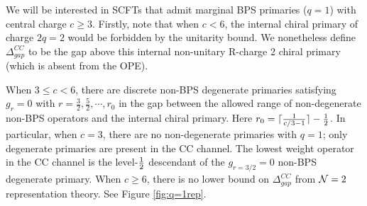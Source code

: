 \documentclass[12pt]{article}
\begin{document}
We will be interested in SCFTs that admit marginal BPS primaries ($q=1$) with central charge $c\geq 3$.
Firstly, note that when $c<6$, the internal chiral primary of charge $2q=2$ would be forbidden by the unitarity bound. We nonetheless define $\Delta^{CC}_{gap}$ to be the gap above this internal non-unitary R-charge 2 chiral primary (which is absent from the OPE).


When $3\le c <6$, there are discrete non-BPS degenerate primaries satisfying $g_r=0$ with $r=\frac 32 , \frac52, \cdots  ,r_0$ in
  the gap between the allowed range of non-degenerate non-BPS operators and the internal chiral primary.   Here $r_0 = \lceil {1\over  c/3-1}\rceil-\frac12$.  In particular, when $c=3$, there are no non-degenerate primaries with $q=1$; only degenerate primaries are present in the CC channel.  The lowest weight operator in the CC channel is the level-${1\over 2}$ descendant of the $g_{r=3/2}=0$ non-BPS degenerate primary. When $c\ge6$, there is no lower bound on $\Delta^{CC}_{gap}$ from ${\mathcal N}=2$ representation theory.  See Figure \ref{fig:q=1rep}.

  
  
\end{document}
